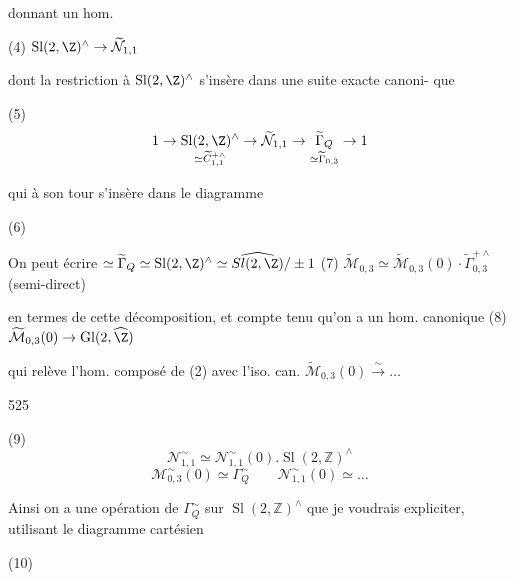 \begin{enumerate}

donnant un hom.

(4) $\operatorname{Sl}(2,\Z)^\wedge \to \widetilde{\mathcal{N}}_{1,1}$

dont la restriction à $\operatorname{Sl}(2,\Z)^\wedge$ s'insère dans une suite exacte canoni-
que

(5) $$1 \to \underset{\simeq \widetilde{C}_{1,1}^{+ \wedge}}{\operatorname{Sl}(2,\Z)^\wedge} \to \widetilde{\mathcal{N}}_{1,1} \to \underset{\simeq \widetilde{\Gamma}_{0,3}}{\widetilde{\Gamma}_Q} \to 1$$

qui à son tour s'insère dans le diagramme

(6)

On peut écrire 
$\simeq \widetilde{\Gamma}_Q \simeq \operatorname{Sl}(2,\Z)^\wedge \simeq \widehat{Sl(2,\Z)}/\pm 1$
(7) $\widetilde{\mathcal{M}}_{0,3} \simeq \widetilde{\mathcal{M}}_{0,3}(0) \cdot \widetilde{\Gamma}_{0,3}^{+ \wedge}$
(semi-direct)

en termes de cette décomposition, et
compte tenu qu'on a un hom.
canonique
(8) $\widetilde{\mathcal{M}}_{0,3}(0) \to \operatorname{Gl}(2,\widehat{\Z})$

qui relève l'hom. composé de (2)
avec l'iso. can.
$\widetilde{\mathcal{M}}_{0,3}(0) \xrightarrow{\sim} \dots$

\newpage


525

(9) $$ \mathcal{N}_{1,1}^\sim \simeq \mathcal{N}_{1,1}^\sim(0) . \operatorname{Sl}(2, \mathbb{Z})^\wedge $$
$$ \mathcal{M}_{0,3}^\sim(0) \simeq \Gamma_Q^\sim \qquad \mathcal{N}_{1,1}^\sim(0) \simeq \dots $$

Ainsi on a une opération de $\Gamma_Q^\sim$
sur $\operatorname{Sl}(2, \mathbb{Z})^\wedge$
que je voudrais expliciter,
utilisant le diagramme cartésien

(10)


\end{enumerate}
